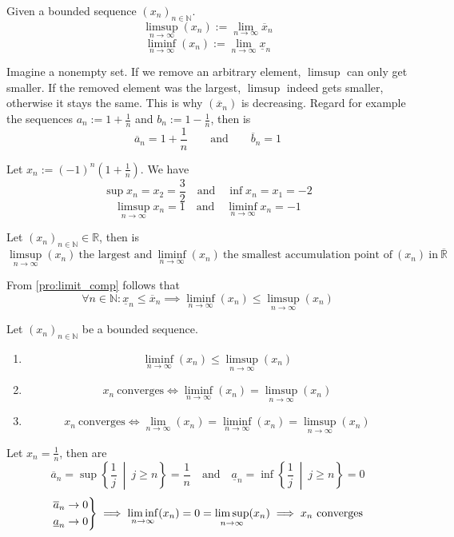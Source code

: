 \begin{definition}
   Given a bounded sequence \((x_n)_{n \in \mathbb{N}}\).
   \[\limsup_{n \to \infty}(x_n) := \lim_{n \to \infty} \overline{x}_n\]
   \[\liminf_{n \to \infty}(x_n) := \lim_{n \to \infty} \underline{x}_n\]
\end{definition}
\begin{remark}[Intuition]
   Imagine a nonempty set.
   If we remove an arbitrary element, \(\limsup\) can only get smaller.
   If the removed element was the largest, \(\limsup\) indeed gets smaller, otherwise it stays the same.
   This is why \((\overline{x}_n)\) is decreasing.
   Regard for example the sequences \(a_n := 1 + \frac{1}{n}\) and \(b_n := 1 - \frac{1}{n}\), then is
   \[\overline{a}_n = 1 + \frac{1}{n} \qquad\text{and}\qquad \overline{b}_n = 1\]
\end{remark}
\begin{example}
   Let \(x_n := (-1)^n \left(1 + \frac{1}{n}\right)\).
   We have
   \[\sup x_n = x_2 = \frac{3}{2} \quad\text{and}\quad \inf x_n = x_1 = -2\]
   \[\limsup_{n \to \infty} x_n = 1 \quad\text{and}\quad \liminf_{n \to \infty} x_n = -1\]
\end{example}

\begin{theorem}
   Let \((x_n)_{n \in \mathbb{N}} \in \mathbb{R}\), then is
   \[\limsup_{n \to \infty}(x_n)~\text{the largest and}~\liminf_{n \to \infty}(x_n)~\text{the smallest accumulation point of}~(x_n)~\text{in}~\overline{\mathbb{R}}\]
\end{theorem}

From \cref{pro:limit_comp} follows that
\[\forall n \in \mathbb{N}: \underline{x}_n \leq \overline{x}_n \implies \liminf_{n \to \infty}(x_n) \leq \limsup_{n \to \infty}(x_n)\]

\begin{theorem}[\(\liminf = \limsup \iff (x_n)\) convergent]\label{thm:limsup_inf_rules}
   Let \((x_n)_{n \in \mathbb{N}}\) be a bounded sequence.
   \begin{enumerate}[label=\roman*, align=Center]
      \item \[\liminf_{n \to \infty}(x_n) \leq \limsup_{n \to \infty}(x_n)\]
      \item \[x_n~\text{converges} \iff \liminf_{n \to \infty}(x_n) = \limsup_{n \to \infty}(x_n)\]
      \item \[x_n~\text{converges} \iff \lim_{n \to \infty}(x_n) = \liminf_{n \to \infty}(x_n) = \limsup_{n \to \infty}(x_n)\]
   \end{enumerate}
\end{theorem}
\begin{example}
   Let \(x_n = \frac{1}{n}\), then are
   \[\overline{a}_n = \sup\left\{\frac{1}{j}~\middle|~j \geq n\right\} = \frac{1}{n} \quad\text{and}\quad \underline{a}_n = \inf\left\{\frac{1}{j}~\middle|~j \geq n\right\} = 0\]
   \[\begin{drcases}
      \overline{a}_n \to 0\\
      \underline{a}_n \to 0
   \end{drcases} \implies \liminf_{n \to \infty}(x_n) = 0 = \limsup_{n \to \infty}(x_n) \implies x_n~\text{converges}\]
\end{example}

